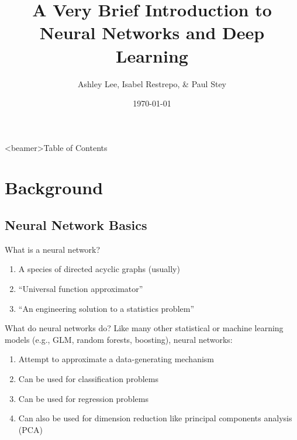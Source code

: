 \documentclass[pdf]{beamer}
\title[Intro to Deep Learning]{A Very Brief Introduction to Neural Networks and Deep Learning}
\author{Ashley Lee, Isabel Restrepo, \& Paul Stey}
\date{\today}
\begin{document}
\begin{frame}
\titlepage
\end{frame}



\begin{frame}<beamer>{Table of Contents}
	\tableofcontents[currentsection, 
				 currentsubsection, 
				 sectionstyle=show, 
				 subsectionstyle=show]
\end{frame}

\section{Background}

\subsection{Neural Network Basics}
	\begin{frame}{What is a neural network?}
		\begin{enumerate}
			\item A species of directed acyclic graphs (usually)
			\item ``Universal function approximator''
			\item ``An engineering solution to a statistics problem''
		\end{enumerate}
	\end{frame}

	\begin{frame}{What do neural networks do?}
	Like many other statistical or machine learning models (e.g., GLM, random forests, boosting), neural networks:
	
	\vspace{1em}
	
		\begin{enumerate}
			\item Attempt to approximate a data-generating mechanism
			\item Can be used for classification problems
			\item Can be used for regression problems
			\item Can also be used for dimension reduction like principal components analysis (PCA)
 
		\end{enumerate}
	\end{frame}
\end{document}
